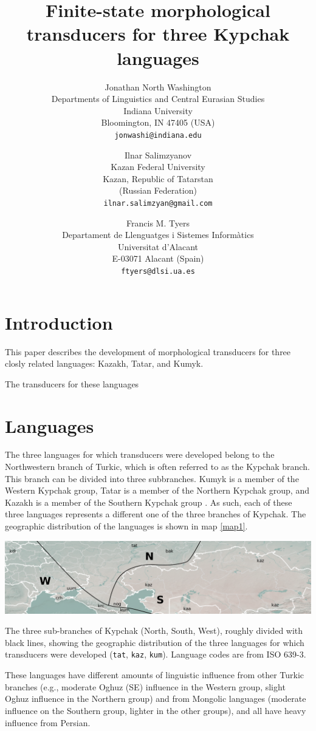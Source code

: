 \documentclass[a4paper,11pt,twocolumn]{article}
\title{Finite-state morphological transducers for three Kypchak languages}
\author{Jonathan North Washington \\
Departments of Linguistics and Central Eurasian Studies\\
Indiana University\\
Bloomington, IN 47405 (USA)\\
\texttt{jonwashi@indiana.edu} \and
Ilnar Salimzyanov  \\
Kazan Federal University \\
Kazan, Republic of Tatarstan\\
(Russian Federation) \\
\texttt{ilnar.salimzyan@gmail.com} \and 
Francis M. Tyers\\
Departament de Llenguatges i Sistemes Informàtics \\  
Universitat d'Alacant\\
E-03071 Alacant (Spain)\\
\texttt{ftyers@dlsi.ua.es} 
}
\begin{document}
\maketitleabstract{}

\section{Introduction}

This paper describes the development of morphological transducers for three closly related languages: Kazakh, Tatar, and Kumyk.

The transducers for these languages 


\section{Languages}

The three languages for which transducers were developed belong to the Northwestern branch of Turkic, which is often referred to as the Kypchak branch.  This branch can be divided into three subbranches.  Kumyk is a member of the Western Kypchak group, Tatar is a member of the Northern Kypchak group, and Kazakh is a member of the Southern Kypchak group \citep[82-83]{histofturkic}.  As such, each of these three languages represents a different one of the three branches of Kypchak.  The geographic distribution of the languages is shown in map \ref{map1}.

\begin{map*}[htbp]
	\includegraphics[width=\textwidth]{map/map}
	\caption{The three sub-branches of Kypchak (North, South, West), roughly divided with black lines, showing the geographic distribution of the three languages for which transducers were developed (\texttt{tat}, \texttt{kaz}, \texttt{kum}).  Language codes are from ISO 639-3.}
	\label{map1}
\end{map*}

These languages have different amounts of linguistic influence from other Turkic branches (e.g., moderate Oghuz (SE) influence in the Western group, slight Oghuz influence in the Northern group) and from Mongolic languages (moderate influence on the Southern group, lighter in the other groups), and all have heavy influence from Persian.
\end{document}
